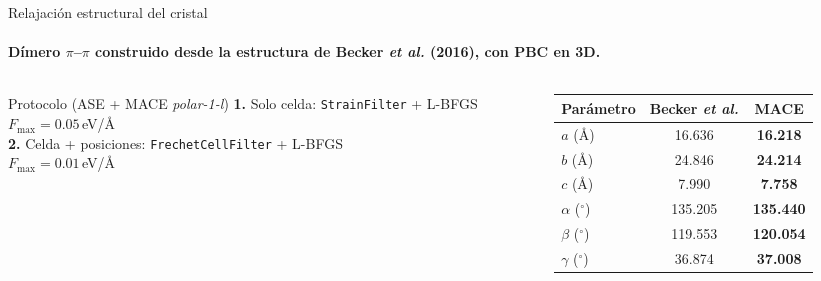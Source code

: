 \documentclass[aspectratio=169,11pt]{beamer}
\begin{document}
\appendix

\begin{frame}[plain]
  \vfill
  \centering
  \vfill
\end{frame}

\begin{frame}{Relajación estructural del cristal}
  \framesubtitle{Dímero $\pi$--$\pi$ construido desde la estructura de Becker \emph{et al.} (2016), con PBC en 3D.}
  \begin{columns}[c,onlytextwidth]
    \begin{column}{0.48\textwidth}
      \begin{block}{Protocolo (ASE + MACE \textit{polar-1-l})}
        \footnotesize
        \textbf{1.} Solo celda: \texttt{StrainFilter} + L-BFGS\\
        \hspace*{1em}$F_{\max}=0.05$\,eV/\AA\\[0.3em]
        \textbf{2.} Celda + posiciones: \texttt{FrechetCellFilter} + L-BFGS\\
        \hspace*{1em}$F_{\max}=0.01$\,eV/\AA
      \end{block}
    \end{column}
    \begin{column}{0.48\textwidth}
      \centering\small
      \renewcommand{\arraystretch}{1.2}
      \begin{tabular}{@{}lcc@{}}
        \toprule
        Parámetro & Becker \emph{et al.} & \textbf{MACE} \\
        \midrule
        $a$ (\AA)           & 16.636  & \textbf{16.218} \\
        $b$ (\AA)           & 24.846  & \textbf{24.214} \\
        $c$ (\AA)           & 7.990   & \textbf{7.758} \\
        $\alpha$ ($^\circ$) & 135.205 & \textbf{135.440} \\
        $\beta$ ($^\circ$)  & 119.553 & \textbf{120.054} \\
        $\gamma$ ($^\circ$) & 36.874  & \textbf{37.008} \\
        \bottomrule
      \end{tabular}
    \end{column}
  \end{columns}
\end{frame}
\end{document}
